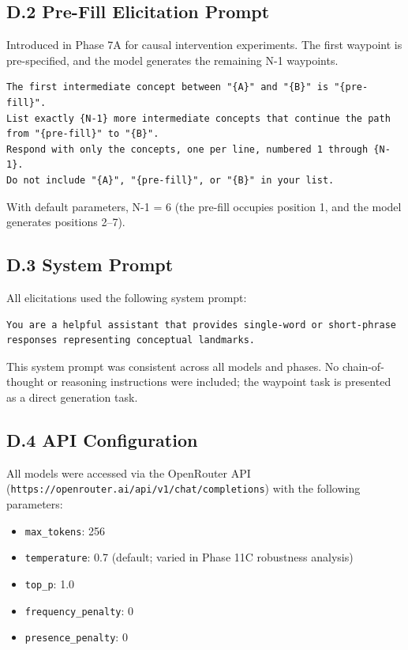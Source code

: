 \subsection{D.2 Pre-Fill Elicitation Prompt}\label{d.2-pre-fill-elicitation-prompt}

Introduced in Phase 7A for causal intervention experiments. The first waypoint is pre-specified, and the model generates the remaining N-1 waypoints.

\begin{verbatim}
The first intermediate concept between "{A}" and "{B}" is "{pre-fill}".
List exactly {N-1} more intermediate concepts that continue the path
from "{pre-fill}" to "{B}".
Respond with only the concepts, one per line, numbered 1 through {N-1}.
Do not include "{A}", "{pre-fill}", or "{B}" in your list.
\end{verbatim}

With default parameters, N-1 = 6 (the pre-fill occupies position 1, and the model generates positions 2--7).

\subsection{D.3 System Prompt}\label{d.3-system-prompt}

All elicitations used the following system prompt:

\begin{verbatim}
You are a helpful assistant that provides single-word or short-phrase
responses representing conceptual landmarks.
\end{verbatim}

This system prompt was consistent across all models and phases. No chain-of-thought or reasoning instructions were included; the waypoint task is presented as a direct generation task.

\subsection{D.4 API Configuration}\label{d.4-api-configuration}

All models were accessed via the OpenRouter API (\texttt{https://openrouter.ai/api/v1/chat/completions}) with the following parameters:

\begin{itemize}
\tightlist
\item
  \texttt{max\_tokens}: 256
\item
  \texttt{temperature}: 0.7 (default; varied in Phase 11C robustness analysis)
\item
  \texttt{top\_p}: 1.0
\item
  \texttt{frequency\_penalty}: 0
\item
  \texttt{presence\_penalty}: 0
\end{itemize}

